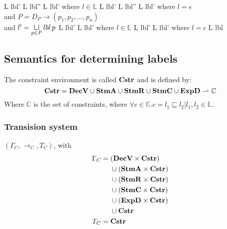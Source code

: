 \begin{trules}
        { {L} {lbl'} }
        { {L} {lbl''} \;\;  {L} {lbl'} }
        {where $l \in \mathbb{L}$}
        { {L} {lbl'} }
        { {L} {lbl''} \;  {L} {lbl'} }
        {where $l = \epsilon$\\
        and $P = D_P \rightarrow (p_1, p_2, \dots, p_n)$\\
        and $l' = \sqcupl\limits_{p \in P} lbl \, p$}
        { {L} {lbl'} }
        { {L} {lbl'} }
        {where $l \in \mathbb{L}$}
        { {L} {lbl'} }
        { {L} {lbl'} }
        {where $l = \epsilon$}
        { {L} {lbl} }
        {}
        {}
\end{trules}

\subsection{Semantics for determining labels}
The constraint environment is called $\mathbf{Cstr}$ and is defined by:
\[
  \mathbf{Cstr} = \mathbf{DecV} \cup \mathbf{StmA} \cup \mathbf{StmR} \cup \mathbf{StmC} \cup \mathbf{ExpD} \rightharpoonup \mathbb{C}
\]
Where $\mathbb{C}$ is the set of constraints, where $\forall c \in \mathbb{C} . c = l_1 \sqsubseteq l_2 | l_1, l_2 \in \mathbb{L}$.

\subsubsection{Transision system}
$(\Gamma_{C}, \rightarrow_{C}, T_{C})$, with
\begin{align*}
  \Gamma_{C} =  & \;        (\mathbf{DecV} \times \mathbf{Cstr}) \\
                & \;  \cup  (\mathbf{StmA} \times \mathbf{Cstr}) \\
                & \;  \cup  (\mathbf{StmR} \times \mathbf{Cstr}) \\
                & \;  \cup  (\mathbf{StmC} \times \mathbf{Cstr}) \\
                & \;  \cup  (\mathbf{ExpD} \times \mathbf{Cstr}) \\
                & \;  \cup   \mathbf{Cstr} \\
  T_{C} =       & \;  \mathbf{Cstr}
\end{align*}

